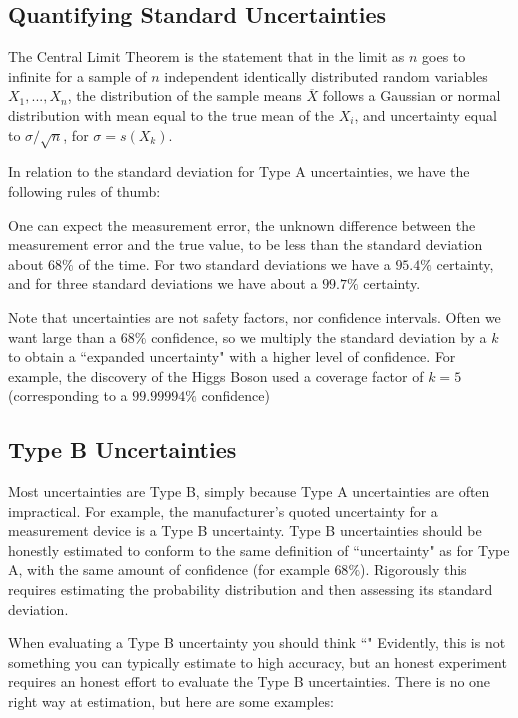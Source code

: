 \subsection{Quantifying Standard Uncertainties}

The Central Limit Theorem is the statement that in the limit as $n$ goes to infinite for a sample of $n$ independent identically distributed random variables $X_1,...,X_n$, the distribution of the sample means $\overline{X}$ follows a Gaussian or normal distribution with mean equal to the true mean of the $X_i$, and uncertainty equal to $\sigma/\sqrt{n}$, for $\sigma = s(X_k)$. 

In relation to the standard deviation for Type A uncertainties, we have the following rules of thumb:

\begin{prop}
    One can expect the measurement error, the unknown difference between the measurement error and the true value, to be less than the standard deviation about $68\%$ of the time. For two standard deviations we have a $95.4\%$ certainty, and for three standard deviations we have about a $99.7\%$ certainty.
\end{prop}

Note that uncertainties are not safety factors, nor confidence intervals. Often we want large than a $68\%$ confidence, so we multiply the standard deviation by a  $k$ to obtain a ``expanded uncertainty" with a higher level of confidence. For example, the discovery of the Higgs Boson used a coverage factor of $k = 5$ (corresponding to a $99.99994\%$ confidence)

\subsection{Type B Uncertainties}

Most uncertainties are Type B, simply because Type A uncertainties are often impractical. For example, the manufacturer's quoted uncertainty for a measurement device is a Type B uncertainty. Type B uncertainties should be honestly estimated to conform to the same definition of ``uncertainty" as for Type A, with the same amount of confidence (for example $68\%$). Rigorously this requires estimating the probability distribution and then assessing its standard deviation.

When evaluating a Type B uncertainty you should think ``" Evidently, this is not something you can typically estimate to high accuracy, but an honest experiment requires an honest effort to evaluate the Type B uncertainties.  There is no one right way at estimation, but here are some examples:

